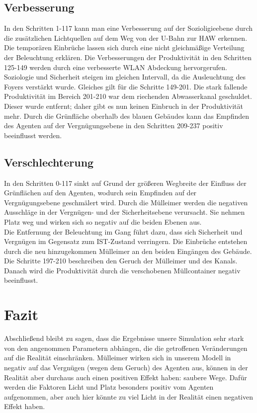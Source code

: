 \documentclass[10pt]{scrartcl}
\begin{document}
\subsection{Verbesserung}
In den Schritten 1-117 kann man eine Verbesserung auf der Sozioligieebene durch die zusätzlichen Lichtquellen auf dem Weg von der U-Bahn zur HAW erkennen. Die temporären Einbrüche lassen sich durch eine nicht gleichmäßige Verteilung der Beleuchtung erklären.
Die Verbesserungen der Produktivität in den Schritten 125-149 werden durch eine verbesserte WLAN Abdeckung hervorgerufen. Soziologie und Sicherheit steigen im gleichen Intervall, da die Ausleuchtung des Foyers verstärkt wurde. Gleiches gilt für die Schritte 149-201. Die stark fallende Produktivität im Bereich 201-210 war dem riechenden Abwasserkanal geschuldet. Dieser wurde entfernt; daher gibt es nun keinen Einbruch in der Produktivität mehr. Durch die Grünfläche oberhalb des blauen Gebäudes kann das Empfinden des Agenten auf der Vergnügungsebene in den Schritten 209-237 positiv beeinflusst werden.
   
\subsection{Verschlechterung}
In den Schritten 0-117 sinkt auf Grund der größeren Wegbreite der Einfluss der Grünflächen auf den Agenten, wodurch sein Empfinden auf der Vergnügungsebene geschmälert wird.
Durch die Mülleimer werden die negativen Ausschläge in der Vergnügen- und der Sicherheitsebene verursacht. Sie nehmen Platz weg und wirken sich so negativ auf die beiden Ebenen aus.\\
Die Entfernung der Beleuchtung im Gang führt dazu, dass sich Sicherheit und Vergnügen im Gegensatz zum IST-Zustand verringern. Die Einbrüche entstehen durch die neu hinzugekommen Mülleimer an den beiden Eingängen des Gebäude.
Die Schritte 197-210 beschreiben den Geruch der Mülleimer und des Kanals. Danach wird die Produktivität durch die verschobenen Müllcontainer negativ beeinflusst.

\section{Fazit}
Abschließend bleibt zu sagen, dass die Ergebnisse unsere Simulation sehr stark von den angenommen Parametern abhängen, die die getroffenen Veränderungen auf die Realität einschränken. Mülleimer wirken sich in unserem Modell in negativ auf das Vergnügen (wegen dem Geruch) des Agenten aus, können in der Realität aber durchaus auch einen positiven Effekt haben: saubere Wege. Dafür werden die Faktoren Licht und Platz besonders positiv vom Agenten aufgenommen, aber auch hier könnte zu viel Licht in der Realität einen negativen Effekt haben.
\end{document}
